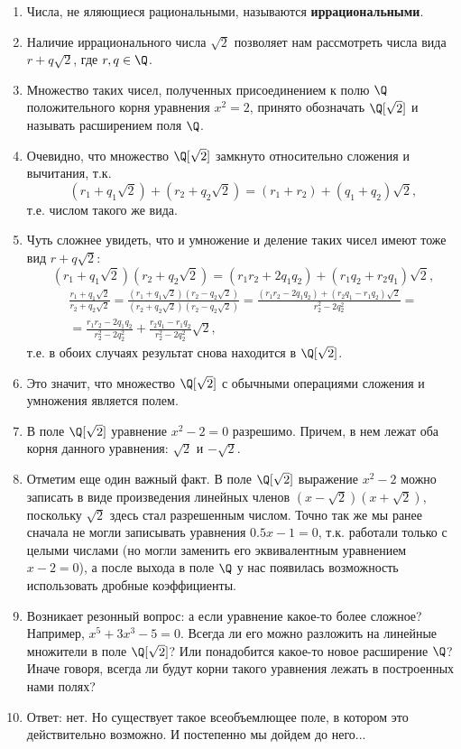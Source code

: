 \begin{enumerate}



\item Числа, не яляющиеся рациональными, называются \textbf{иррациональными}.
\item Наличие иррационального числа $\sqrt 2$ позволяет нам рассмотреть числа вида $r+q\sqrt 2$, где $r,q\in\Q$.
\item Множество таких чисел, полученных присоединением к полю $\Q$ положительного корня уравнения $x^2=2$, принято обозначать $\Q[\sqrt 2]$ и называть расширением поля $\Q$.
\item Очевидно, что множество $\Q[\sqrt 2]$ замкнуто относительно сложения и вычитания, т.к.
$$
(r_1+q_1\sqrt 2)+(r_2+q_2\sqrt 2)=(r_1+r_2)+(q_1+q_2)\sqrt 2,
$$
т.е. числом такого же вида.
\item Чуть сложнее увидеть, что и умножение и деление таких чисел имеют тоже вид $r+q\sqrt 2$:
$$
(r_1+q_1\sqrt 2)(r_2+q_2\sqrt 2)=(r_1r_2+2q_1q_2)+(r_1q_2+r_2q_1)\sqrt 2,
$$
\begin{multline*}
\frac{r_1+q_1\sqrt 2}{r_2+q_2\sqrt 2}=\frac{(r_1+q_1\sqrt 2)(r_2-q_2\sqrt 2)}{(r_2+q_2\sqrt 2)(r_2-q_2\sqrt 2)}=
\frac{(r_1r_2-2q_1q_2)+(r_2q_1-r_1q_2)\sqrt 2}{r_2^2-2q_2^2}= \\
=\frac{r_1r_2-2q_1q_2}{r_2^2-2q_2^2}+\frac{r_2q_1-r_1q_2}{r_2^2-2q_2^2}\sqrt 2,
\end{multline*}
т.е. в обоих случаях результат снова находится в $\Q[\sqrt 2]$.
\item Это значит, что множество $\Q[\sqrt 2]$ с обычными операциями сложения и умножения является полем.
\item В поле $\Q[\sqrt 2]$ уравнение $x^2-2=0$ разрешимо. Причем, в нем лежат оба корня данного уравнения: $\sqrt 2$ и $-\sqrt 2$.
\item Отметим еще один важный факт. В поле $\Q[\sqrt 2]$ выражение $x^2-2$ можно записать в виде произведения линейных членов $(x-\sqrt 2)(x+\sqrt 2)$, поскольку $\sqrt 2$ здесь стал разрешенным числом. Точно так же мы ранее сначала не могли записывать уравнения $0.5x-1=0$, т.к. работали только с целыми числами (но могли заменить его эквивалентным уравнением $x-2=0$), а после выхода в поле $\Q$ у нас появилась возможность использовать дробные коэффициенты.
\item Возникает резонный вопрос: а если уравнение какое-то более сложное? Например, $x^5+3x^3-5=0$. Всегда ли его можно разложить на линейные множители в поле $\Q[\sqrt 2]$? Или понадобится какое-то новое расширение $\Q$?
Иначе говоря, всегда ли будут корни такого уравнения лежать в построенных нами полях?
\item Ответ: нет. Но существует такое всеобъемлющее поле, в котором это действительно возможно. И постепенно мы дойдем до него...
\end{enumerate}


